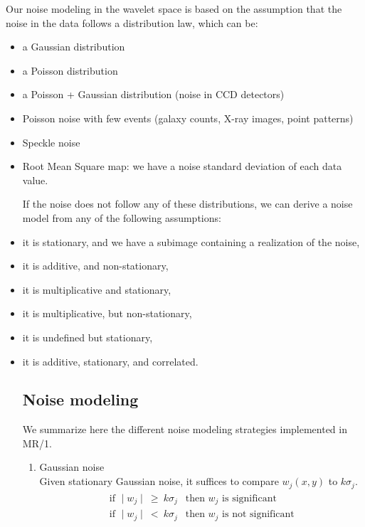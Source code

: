 Our noise modeling in the wavelet space is based on the assumption that the
noise in the data follows a distribution law, which can be: 
\begin{itemize}
\baselineskip=0.4truecm
\item a Gaussian distribution 
\item a Poisson distribution  
\item a Poisson + Gaussian  distribution (noise in CCD detectors)
\item Poisson noise with few events (galaxy counts, X-ray images, 
point patterns)
\item Speckle noise
\item Root Mean Square map: we have a noise standard deviation of each data value.
\ei
 
If the noise does not  follow any of these distributions, 
we can derive a noise model
from any of the following assumptions:
\bi
\item it is stationary, and we have a subimage containing 
a realization of the noise,
\item it is additive, and non-stationary,
\item it is multiplicative and stationary,
\item it is multiplicative, but non-stationary,
\item it is undefined but stationary,
\item it is additive, stationary, and correlated.
\ei

\subsection{Noise modeling}
We summarize here the different noise modeling 
strategies implemented in MR/1.
\label{sect_noise}

\begin{enumerate}
\item{Gaussian noise} \\
Given stationary Gaussian noise, it suffices to compare $w_j(x,y)$ to $k \sigma_j$.   
\begin{eqnarray}
\begin{array}{l}
\mbox{ if }  \mid w_j \mid \ \geq \ k \sigma_j \ \ \mbox{ then } w_j \mbox{ is significant } \\ 
\mbox{ if }  \mid w_j \mid \ < \ k \sigma_j \ \ \mbox{ then } w_j \mbox{ is not significant }
\end{array}
\end{eqnarray}


\end{enumerate}
\end{itemize}
